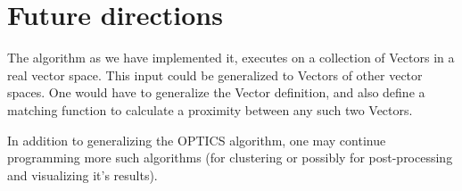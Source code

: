\documentclass[12pt,a4paper]{article}
\begin{document}
\section{Future directions}
The algorithm as we have implemented it, executes on a collection of Vectors in a real vector space. This input could be generalized to Vectors of other vector spaces. One would have to generalize the Vector definition, and also define a matching function to calculate a proximity between any such two Vectors.

In addition to generalizing the OPTICS algorithm, one may continue programming more such algorithms (for clustering or possibly for post-processing and visualizing it's results).
\end{document}
